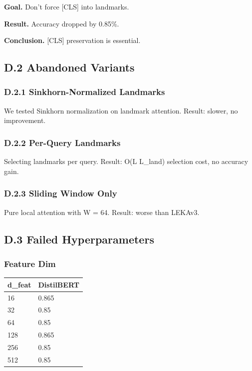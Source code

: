 \textbf{Goal.} Don't force [CLS] into landmarks.

\textbf{Result.} Accuracy dropped by 0.85\%.

\textbf{Conclusion.} [CLS] preservation is essential.

\subsection{D.2 Abandoned Variants}

\subsubsection{D.2.1 Sinkhorn-Normalized Landmarks}

We tested Sinkhorn normalization on landmark attention. Result: slower, 
no improvement.

\subsubsection{D.2.2 Per-Query Landmarks}

Selecting landmarks per query. Result: O(L L\_land) selection cost, no 
accuracy gain.

\subsubsection{D.2.3 Sliding Window Only}

Pure local attention with W = 64. Result: worse than LEKAv3.

\subsection{D.3 Failed Hyperparameters}

\subsubsection{Feature Dim}

\begin{table}[H]
\centering
\small
\begin{tabular}{ll}
\toprule
\textbf{d\_feat} & \textbf{DistilBERT} \\
\midrule
16 & 0.865 \\
32 & 0.85 \\
64 & 0.85 \\
128 & 0.865 \\
256 & 0.85 \\
512 & 0.85 \\
\bottomrule
\end{tabular}
\end{table}

